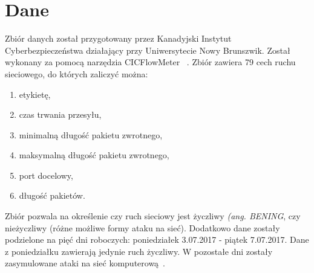 \section{Dane}
\label{sec:data}
Zbiór danych został przygotowany przez Kanadyjski Instytut Cyberbezpieczeństwa działający przy Uniwersytecie Nowy Brunszwik. Został wykonany za pomocą narzędzia CICFlowMeter
~\cite{Ahlashkari2022}. Zbiór zawiera 79 cech ruchu sieciowego, do których zaliczyć można:
\begin{enumerate}
    \item etykietę,
    \item czas trwania przesyłu,
    \item minimalną długość pakietu zwrotnego,
    \item maksymalną długość pakietu zwrotnego,
    \item port docelowy,
    \item długość pakietów.
\end{enumerate}
Zbiór pozwala na określenie czy ruch sieciowy jest życzliwy \textit{(ang. BENING}, czy nieżyczliwy (różne możliwe formy ataku na sieć). Dodatkowo dane zostały podzielone na pięć dni roboczych: poniedziałek 3.07.2017 - piątek 7.07.2017. Dane z poniedziałku zawierają jedynie ruch życzliwy. W pozostałe dni zostały zasymulowane ataki na sieć komputerową~\cite{Blyszcz2022, unbkaggle}.


